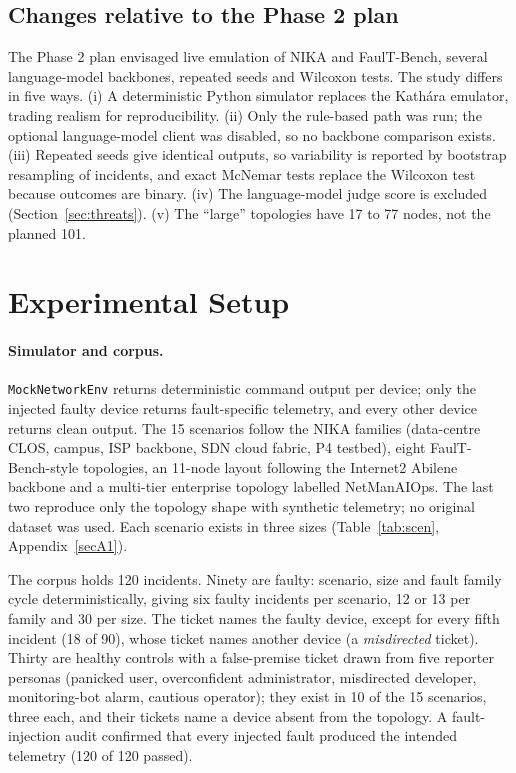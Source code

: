 \documentclass[pdflatex,sn-basic,Numbered,iicol]{sn-jnl}
\begin{document}
\subsection{Changes relative to the Phase 2 plan}\label{sec:changes}
The Phase 2 plan envisaged live emulation of NIKA and FaulT-Bench, several language-model backbones, repeated seeds and Wilcoxon tests. The study differs in five ways. (i) A deterministic Python simulator replaces the Kath\'ara emulator, trading realism for reproducibility. (ii) Only the rule-based path was run; the optional language-model client was disabled, so no backbone comparison exists. (iii) Repeated seeds give identical outputs, so variability is reported by bootstrap resampling of incidents, and exact McNemar tests replace the Wilcoxon test because outcomes are binary. (iv) The language-model judge score is excluded (Section~\ref{sec:threats}). (v) The ``large'' topologies have 17 to 77 nodes, not the planned 101.

\section{Experimental Setup}\label{sec:setup}

\paragraph{Simulator and corpus.} \texttt{MockNetworkEnv} returns deterministic command output per device; only the injected faulty device returns fault-specific telemetry, and every other device returns clean output. The 15 scenarios follow the NIKA families (data-centre CLOS, campus, ISP backbone, SDN cloud fabric, P4 testbed), eight FaulT-Bench-style topologies, an 11-node layout following the Internet2 Abilene backbone and a multi-tier enterprise topology labelled NetManAIOps. The last two reproduce only the topology shape with synthetic telemetry; no original dataset was used. Each scenario exists in three sizes (Table~\ref{tab:scen}, Appendix~\ref{secA1}).

The corpus holds 120 incidents. Ninety are faulty: scenario, size and fault family cycle deterministically, giving six faulty incidents per scenario, 12 or 13 per family and 30 per size. The ticket names the faulty device, except for every fifth incident (18 of 90), whose ticket names another device (a \emph{misdirected} ticket). Thirty are healthy controls with a false-premise ticket drawn from five reporter personas (panicked user, overconfident administrator, misdirected developer, monitoring-bot alarm, cautious operator); they exist in 10 of the 15 scenarios, three each, and their tickets name a device absent from the topology. A fault-injection audit confirmed that every injected fault produced the intended telemetry (120 of 120 passed).
\end{document}
